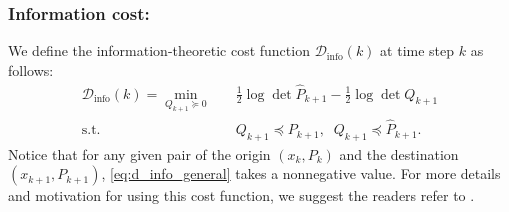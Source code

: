 \documentclass[Afour,sageh,times]{sagej}
\newcommand{\bx}{{\bf x}}
\newcommand{\by}{{\bf y}}
\begin{document}
\subsubsection{Information cost:}
We define the information-theoretic cost function $\mathcal{D}_{\text{info}}(k)$ at time step $k$
as follows:
\begin{subequations}
\label{eq:d_info_general0}
\begin{align}
\mathcal{D}_{\text{info}}(k)=\!\!\min_{Q_{k+1}\succeq 0}\!\! & \quad \frac{1}{2}\log\det \hat{P}_{k+1}-\frac{1}{2}\log\det Q_{k+1} \label{eq:d_info_general}\\
\text{s.t.} &\quad Q_{k+1} \preceq P_{k+1}, \;\; Q_{k+1} \preceq \hat{P}_{k+1}.\label{eq:d_info_general1}
\end{align}
\end{subequations}
Notice that for any given pair of the origin $(x_k, P_k)$ and the destination $(x_{k+1}, P_{k+1})$, \eqref{eq:d_info_general} takes a nonnegative value. For more details and motivation for using this cost function, we suggest the readers refer to \cite{pedram2021gaussian}.
\end{document}
